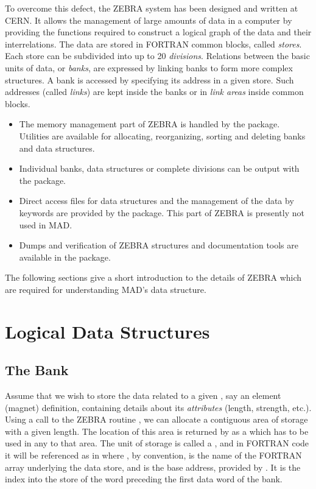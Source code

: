 To overcome this defect, the ZEBRA system \cite{ZEBRA}
has been designed and written at CERN.
It allows the management of large amounts of data in a computer
by providing the functions required to construct a logical graph
of the data and their interrelations.
The data are stored in FORTRAN common blocks, called {\em stores}.
Each store can be subdivided into up to 20 {\em divisions}.
Relations between the basic units of data, or {\em banks},
are expressed by linking banks to form more complex structures.
A bank is accessed by specifying its address in a given store.
Such addresses (called {\em links}) are kept inside the
banks or in {\em link areas} inside common blocks.
 
\begin{itemize}
\item
The memory management part of ZEBRA is handled by the  package.
Utilities are available for allocating, reorganizing,
sorting and deleting banks and data structures.
\item
Individual banks, data structures or complete divisions
can be output with the  package.
\item
Direct access files for data structures and the management
of the data by keywords are provided by the  package.
This part of ZEBRA is presently not used in MAD.
\item
Dumps and verification of ZEBRA structures and documentation tools
are available in the  package.
\end{itemize}
The following sections give a short introduction to the details
of ZEBRA which are required for understanding MAD's data structure.
 
\section{Logical Data Structures}
\subsection{The Bank}
Assume that we wish to store the data related to a given
, say an element (magnet) definition, containing
details about its {\em attributes}
(length, strength, etc.).
Using a call to the ZEBRA routine ,
we can allocate a contiguous area of storage with a given length.
The location of this area is returned by  as a
 which has to be used in any 
to that area.
The unit of storage is called a ,
and in FORTRAN code it will be referenced as in
where , by convention, is the name of the FORTRAN array
underlying the data store,
and  is the base address, provided by .
It is the index into the store of the word preceding
the first data word of the bank.
 
